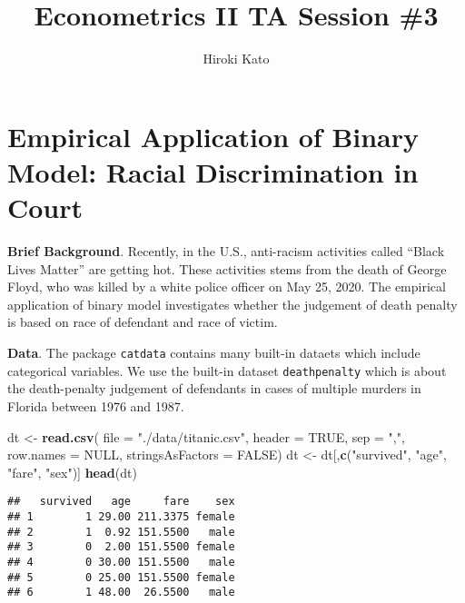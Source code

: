 \documentclass[
  12pt,
]{article}
\title{Econometrics II TA Session \#3}
\author{Hiroki Kato}
\date{}
\newenvironment{Shaded}{\begin{snugshade}}{\end{snugshade}}
\newcommand{\DataTypeTok}[1]{\textcolor[rgb]{0.13,0.29,0.53}{#1}}
\newcommand{\KeywordTok}[1]{\textcolor[rgb]{0.13,0.29,0.53}{\textbf{#1}}}
\newcommand{\NormalTok}[1]{#1}
\newcommand{\OtherTok}[1]{\textcolor[rgb]{0.56,0.35,0.01}{#1}}
\newcommand{\StringTok}[1]{\textcolor[rgb]{0.31,0.60,0.02}{#1}}
\begin{document}
\maketitle

\hypertarget{empirical-application-of-binary-model-racial-discrimination-in-court}{%
\section{Empirical Application of Binary Model: Racial Discrimination in
Court}\label{empirical-application-of-binary-model-racial-discrimination-in-court}}

\textbf{Brief Background}. Recently, in the U.S., anti-racism activities
called ``Black Lives Matter'' are getting hot. These activities stems
from the death of George Floyd, who was killed by a white police officer
on May 25, 2020. The empirical application of binary model investigates
whether the judgement of death penalty is based on race of defendant and
race of victim.

\noindent \textbf{Data}. The package \texttt{catdata} contains many
built-in dataets which include categorical variables. We use the
built-in dataset \texttt{deathpenalty} which is about the death-penalty
judgement of defendants in cases of multiple murders in Florida between
1976 and 1987.

\begin{Shaded}
\begin{Highlighting}[]
\NormalTok{dt \textless{}{-}}\StringTok{ }\KeywordTok{read.csv}\NormalTok{(}
  \DataTypeTok{file =} \StringTok{"./data/titanic.csv"}\NormalTok{, }
  \DataTypeTok{header =} \OtherTok{TRUE}\NormalTok{,  }\DataTypeTok{sep =} \StringTok{","}\NormalTok{, }\DataTypeTok{row.names =} \OtherTok{NULL}\NormalTok{,  }\DataTypeTok{stringsAsFactors =} \OtherTok{FALSE}\NormalTok{)}
\NormalTok{dt \textless{}{-}}\StringTok{ }\NormalTok{dt[,}\KeywordTok{c}\NormalTok{(}\StringTok{"survived"}\NormalTok{, }\StringTok{"age"}\NormalTok{, }\StringTok{"fare"}\NormalTok{, }\StringTok{"sex"}\NormalTok{)]}
\KeywordTok{head}\NormalTok{(dt)}
\end{Highlighting}
\end{Shaded}

\begin{verbatim}
##   survived   age     fare    sex
## 1        1 29.00 211.3375 female
## 2        1  0.92 151.5500   male
## 3        0  2.00 151.5500 female
## 4        0 30.00 151.5500   male
## 5        0 25.00 151.5500 female
## 6        1 48.00  26.5500   male
\end{verbatim}
\end{document}

